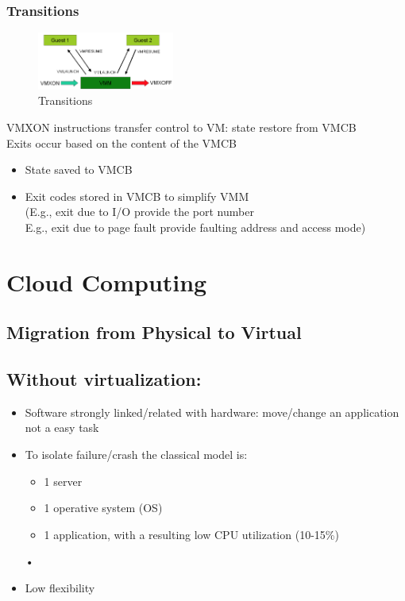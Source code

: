 \documentclass[10pt, oneside]{article}
\begin{document}
\subsubsection{Transitions}
\begin{figure}[H]
    \begin{center}
    \includegraphics[width=0.4\textwidth]{img/img49.png}
    \caption{Transitions}
    \label{fig:Transitions}
    \end{center}
\end{figure}
VMXON instructions transfer control to VM: state restore from VMCB\\
Exits occur based on the content of the VMCB\begin{itemize}
    \item State saved to VMCB
    \item Exit codes stored in VMCB to simplify VMM\\
    (E.g., exit due to I/O provide the port number\\
    E.g., exit due to page fault provide faulting address and access mode)
\end{itemize}
\newpage

\section{Cloud Computing}
\subsection{Migration from Physical to Virtual}
\subsection*{Without virtualization:}\begin{itemize}
    \item Software strongly linked/related with hardware: move/change an application not a easy task
    \item To isolate failure/crash the classical model is:\begin{itemize}
        \item 1 server
        \item 1 operative system (OS)
        \item 1 application, with a resulting low CPU utilization (10-15\%)
    \end{itemize} • 
    \item Low flexibility
\end{itemize}
\end{document}
